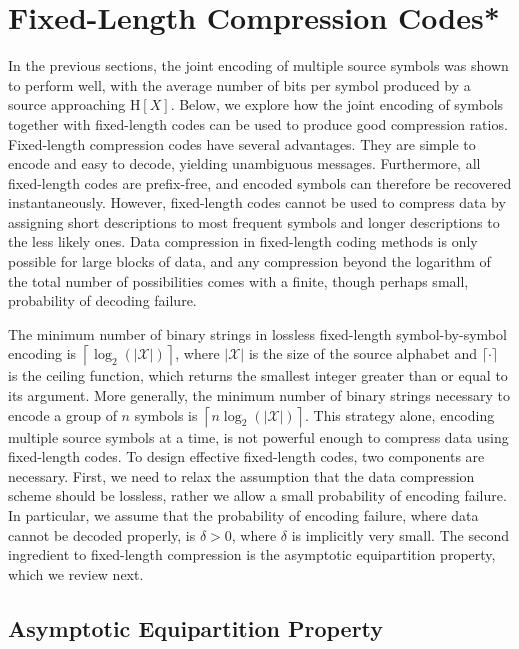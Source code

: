 \section{Fixed-Length Compression Codes*}

In the previous sections, the joint encoding of multiple source symbols was shown to perform well, with the average number of bits per symbol produced by a source approaching $\mathrm{H}[X]$.
Below, we explore how the joint encoding of symbols together with fixed-length codes can be used to produce good compression ratios.
Fixed-length compression codes have several advantages.
They are simple to encode and easy to decode, yielding unambiguous messages.
Furthermore, all fixed-length codes are prefix-free, and encoded symbols can therefore be recovered instantaneously.
However, fixed-length codes cannot be used to compress data by assigning short descriptions to most frequent symbols and longer descriptions to the less likely ones.
Data compression in fixed-length coding methods is only possible for large blocks of data, and any compression beyond the logarithm of the total number of possibilities comes with a finite, though perhaps small, probability of decoding failure.

The minimum number of binary strings in lossless fixed-length symbol-by-symbol encoding is $\left\lceil \log_2 ( | \mathcal{X} | ) \right\rceil$, where $| \mathcal{X} |$ is the size of the source alphabet and $\lceil \cdot \rceil$ is the ceiling function, which returns the smallest integer greater than or equal to its argument.
More generally, the minimum number of binary strings necessary to encode a group of $n$ symbols is $\left\lceil n \log_2 ( | \mathcal{X} | ) \right\rceil$.
This strategy alone, encoding multiple source symbols at a time, is not powerful enough to compress data using fixed-length codes.
To design effective fixed-length codes, two components are necessary.
First, we need to relax the assumption that the data compression scheme should be lossless, rather we allow a small probability of encoding failure.
In particular, we assume that the probability of encoding failure, where data cannot be decoded properly, is $\delta > 0$, where $\delta$ is implicitly very small.
The second ingredient to fixed-length compression is the asymptotic equipartition property, which we review next.


\subsection{Asymptotic Equipartition Property}

